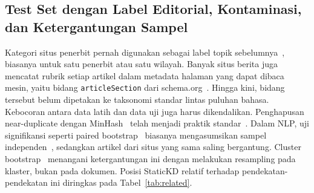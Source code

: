 \documentclass[journal]{IEEEtran}
\begin{document}
\subsection{Test Set dengan Label Editorial, Kontaminasi, dan Ketergantungan Sampel}
Kategori situs penerbit pernah digunakan sebagai label topik sebelumnya~\cite{mirashi2023indicnews}, biasanya untuk satu penerbit atau satu wilayah. Banyak situs berita juga mencatat rubrik setiap artikel dalam metadata halaman yang dapat dibaca mesin, yaitu bidang \texttt{articleSection} dari schema.org~\cite{guha2016schema}. Hingga kini, bidang tersebut belum dipetakan ke taksonomi standar lintas puluhan bahasa. Kebocoran antara data latih dan data uji juga harus dikendalikan. Penghapusan near-duplicate dengan MinHash~\cite{broder1997resemblance} telah menjadi praktik standar~\cite{lee2022dedup}. Dalam NLP, uji signifikansi seperti paired bootstrap~\cite{koehn2004significance} biasanya mengasumsikan sampel independen~\cite{dror2018hitchhiker}, sedangkan artikel dari situs yang sama saling bergantung. Cluster bootstrap~\cite{field2007bootstrapping} menangani ketergantungan ini dengan melakukan resampling pada klaster, bukan pada dokumen. Posisi StaticKD relatif terhadap pendekatan-pendekatan ini diringkas pada Tabel~\ref{tab:related}.

\begin{table}[!t]
\caption{Position of StaticKD Relative to Related Approaches}
\label{tab:related}
\centering
\footnotesize
\setlength{\tabcolsep}{4pt}
\end{table}
\end{document}
